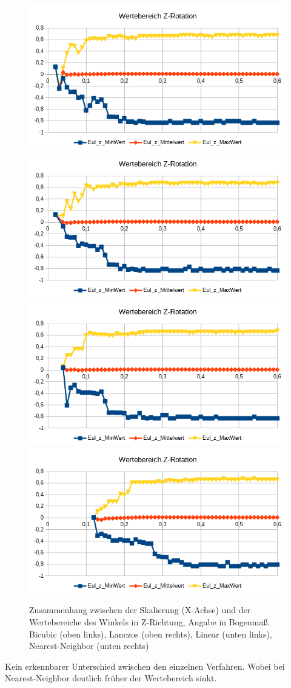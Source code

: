 \begin{figure}
	\centering
	\includegraphics[width=0.45\linewidth]{tabelle2/Z_Rot_Val_Cubic}
	\includegraphics[width=0.45\linewidth]{tabelle2/Z_Rot_Val_Lanc}
	\includegraphics[width=0.45\linewidth]{tabelle2/Z_Rot_Val_Linear}
	\includegraphics[width=0.45\linewidth]{tabelle2/Z_Rot_Val_NN}
	\caption{Zusammenhang zwischen der Skalierung (X-Achse) und der Wertebereiche des Winkels in Z-Richtung, Angabe in Bogenmaß.
		Bicubic (oben links), Lanczos (oben rechts), Linear (unten links), Nearest-Neighbor (unten rechts)}
	\label{img_Z_Rot_Val_Skal}
\end{figure}
Kein erkennbarer Unterschied zwischen den einzelnen Verfahren. Wobei bei Nearest-Neighbor deutlich früher der Wertebereich sinkt.
